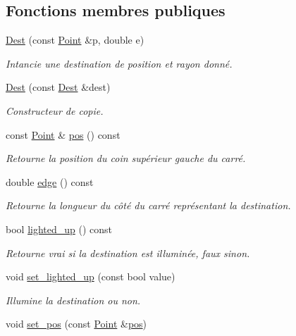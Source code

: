 \subsection*{Fonctions membres publiques}
\begin{DoxyCompactItemize}
\item 
\hyperlink{classDest_ac4b55b2569af4d98a6b265becf8922a7}{Dest} (const \hyperlink{classPoint}{Point} \&p, double e)
\begin{DoxyCompactList}\small\item\em Intancie une destination de position et rayon donné. \end{DoxyCompactList}\item 
\hyperlink{classDest_ad5bc62f6c24692e9ca8116c0b43d8dbb}{Dest} (const \hyperlink{classDest}{Dest} \&dest)
\begin{DoxyCompactList}\small\item\em Constructeur de copie. \end{DoxyCompactList}\item 
const \hyperlink{classPoint}{Point} \& \hyperlink{classDest_a40eed96fe590c1ecc354239dfed73b5e}{pos} () const 
\begin{DoxyCompactList}\small\item\em Retourne la position du coin supérieur gauche du carré. \end{DoxyCompactList}\item 
double \hyperlink{classDest_a3a8acfcc4637300fe240c299881c5c61}{edge} () const 
\begin{DoxyCompactList}\small\item\em Retourne la longueur du côté du carré représentant la destination. \end{DoxyCompactList}\item 
bool \hyperlink{classDest_af549b51a5ddf4cbdab7e95e0e07ee5d4}{lighted\+\_\+up} () const 
\begin{DoxyCompactList}\small\item\em Retourne vrai si la destination est illuminée, faux sinon. \end{DoxyCompactList}\item 
void \hyperlink{classDest_a52ab303c379e3f541692effccf183329}{set\+\_\+lighted\+\_\+up} (const bool value)
\begin{DoxyCompactList}\small\item\em Illumine la destination ou non. \end{DoxyCompactList}\item 
void \hyperlink{classDest_acdf685e262d90814429717f3270e215f}{set\+\_\+pos} (const \hyperlink{classPoint}{Point} \&\hyperlink{classDest_a40eed96fe590c1ecc354239dfed73b5e}{pos})

\end{DoxyCompactItemize}
